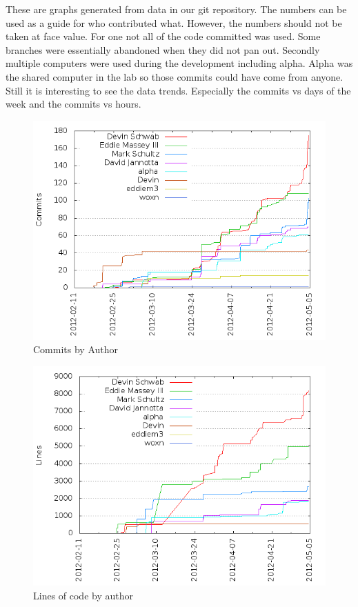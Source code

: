 \documentclass[10pt,letterpaper,final]{report}
\begin{document}
These are graphs generated from data in our git repository. The numbers can be used as a guide for who contributed what. However, the numbers should not be taken at face value.  For one not all of the code committed was used. Some branches were essentially abandoned when they did not pan out. Secondly multiple computers were used during the development including alpha. Alpha was the shared computer in the lab so those commits could have come from anyone. Still it is interesting to see the data trends. Especially the commits vs days of the week and the commits vs hours.

\FloatBarrier
\begin{figure}[h]
  \centering
  \includegraphics{images/commits_by_author.png}
  \caption{Commits by Author}
\end{figure}

\begin{figure}[h]
  \centering
  \includegraphics{images/lines_of_code_by_author.png}
  \caption{Lines of code by author}
\end{figure}
\end{document}
